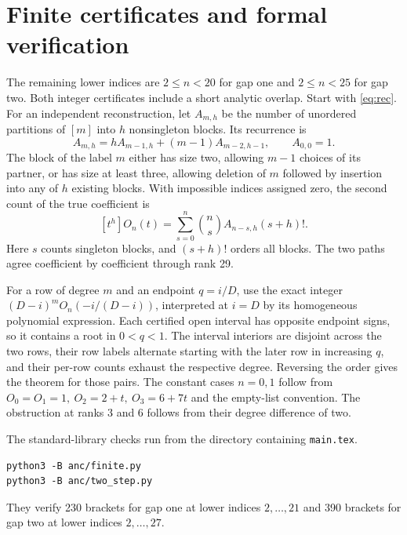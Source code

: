 \documentclass[11pt]{article}
\begin{document}
\section{Finite certificates and formal verification}

The remaining lower indices are \(2\le n<20\) for gap one and \(2\le n<25\) for gap two. Both integer certificates include a short analytic overlap. Start with \eqref{eq:rec}. For an independent reconstruction, let \(A_{m,h}\) be the number of unordered partitions of \([m]\) into \(h\) nonsingleton blocks. Its recurrence is
\[
 A_{m,h}=hA_{m-1,h}+(m-1)A_{m-2,h-1},\qquad A_{0,0}=1.
\]
The block of the label \(m\) either has size two, allowing \(m-1\) choices of its partner, or has size at least three, allowing deletion of \(m\) followed by insertion into any of \(h\) existing blocks. With impossible indices assigned zero, the second count of the true coefficient is
\[
 [t^h]O_n(t)=\sum_{s=0}^n\binom ns A_{n-s,h}(s+h)! .
\]
Here \(s\) counts singleton blocks, and \((s+h)!\) orders all blocks.
The two paths agree coefficient by coefficient through rank 29.

For a row of degree \(m\) and an endpoint \(q=i/D\), use the exact integer
\((D-i)^m O_n(-i/(D-i))\), interpreted at \(i=D\) by its homogeneous polynomial expression. Each certified open interval has opposite endpoint signs, so it contains a root in \(0<q<1\). The interval interiors are disjoint across the two rows, their row labels alternate starting with the later row in increasing \(q\), and their per-row counts exhaust the respective degree. Reversing the order gives the theorem for those pairs. The constant cases \(n=0,1\) follow from \(O_0=O_1=1,\ O_2=2+t,\ O_3=6+7t\) and the empty-list convention. The obstruction at ranks 3 and 6 follows from their degree difference of two.

The standard-library checks run from the directory containing \texttt{main.tex}.
\begin{verbatim}
python3 -B anc/finite.py
python3 -B anc/two_step.py
\end{verbatim}
They verify 230 brackets for gap one at lower indices \(2,\ldots,21\) and
390 brackets for gap two at lower indices \(2,\ldots,27\).
\end{document}
